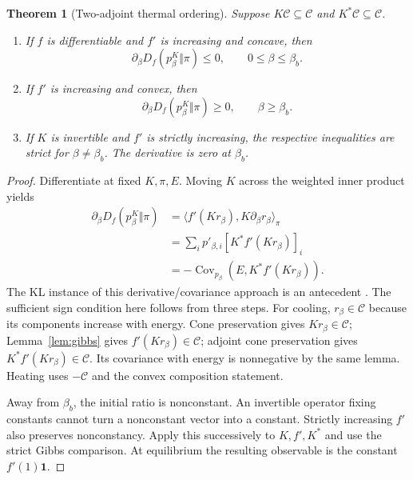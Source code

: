 \documentclass[11pt,a4paper]{article}
\newtheorem{theorem}{Theorem}
\theoremstyle{remark}\newtheorem{remark}[theorem]{Remark}
\newcommand{\C}{\mathcal C}
\newcommand{\one}{\mathbf 1}
\newcommand{\Cov}{\operatorname{Cov}}
\begin{document}
\begin{theorem}[Two-adjoint thermal ordering]\label{thm:metric}
Suppose $K\C\subseteq\C$ and $K^*\C\subseteq\C$.
\begin{enumerate}[label=(\roman*)]
\item If $f$ is differentiable and $f'$ is increasing and concave, then
\begin{equation}
 \partial_\beta D_f(p^K_\beta\Vert\pi)\le0,
 \qquad 0\le\beta\le\beta_b.
 \label{eq:cool}
\end{equation}
\item If $f'$ is increasing and convex, then
\begin{equation}
 \partial_\beta D_f(p^K_\beta\Vert\pi)\ge0,
 \qquad \beta\ge\beta_b.
 \label{eq:heat}
\end{equation}
\item If $K$ is invertible and $f'$ is strictly increasing, the respective inequalities are strict for $\beta\ne\beta_b$. The derivative is zero at $\beta_b$.
\end{enumerate}
\end{theorem}
\begin{proof}
Differentiate at fixed $K,\pi,E$. Moving $K$ across the weighted inner product yields
\begin{align}
 \partial_\beta D_f(p^K_\beta\Vert\pi)
 &=\langle f'(Kr_\beta),K\partial_\beta r_\beta\rangle_\pi\nonumber\\
 &=\sum_i p'_{\beta,i}[K^*f'(Kr_\beta)]_i\nonumber\\
 &=-\Cov_{p_\beta}\!\left(E,K^*f'(Kr_\beta)\right).
 \label{eq:mainidentity}
\end{align}
The KL instance of this derivative/covariance approach is an antecedent \cite{Ohga2024}. The sufficient sign condition here follows from three steps. For cooling, $r_\beta\in\C$ because its components increase with energy. Cone preservation gives $Kr_\beta\in\C$; Lemma~\ref{lem:gibbs} gives $f'(Kr_\beta)\in\C$; adjoint cone preservation gives $K^*f'(Kr_\beta)\in\C$. Its covariance with energy is nonnegative by the same lemma. Heating uses $-\C$ and the convex composition statement.

Away from $\beta_b$, the initial ratio is nonconstant. An invertible operator fixing constants cannot turn a nonconstant vector into a constant. Strictly increasing $f'$ also preserves nonconstancy. Apply this successively to $K,f',K^*$ and use the strict Gibbs comparison. At equilibrium the resulting observable is the constant $f'(1)\one$.
\end{proof}
\end{document}
